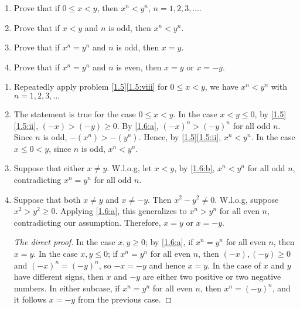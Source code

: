 \begin{pr} \label{1.6}
  \begin{enumerate}[label=(\alph*)]
    \item \label{1.6:a}
    Prove that if $0\leq x<y$, then $x^n<y^n$,
    $n=1,2,3,\dots$.
    \item \label{1.6:b}
    Prove that if $x<y$ and $n$ is odd,
    then $x^n<y^n$.
    \item \label{1.6:c}
    Prove that if $x^n=y^n$ and $n$ is odd,
    then $x=y$.
    \item \label{1.6:d}
    Prove that if $x^n=y^n$ and $n$ is even,
    then $x=y$ or $x=-y$.
  \end{enumerate}
\end{pr}
\pagebreak
\begin{solution}
  \begin{enumerate}[label=(\alph*)]
    \item
    Repeatedly apply problem \ref{1.5}\ref{1.5:viii} for
    $0\leq x<y$, we have $x^n<y^n$ with $n=1,2,3,\ldots$
    \item
    The statement is true for the case $0\leq x<y$. In
    the case $x<y\leq 0$, by \ref{1.5}\ref{1.5:ii},
    $(-x)>(-y)\geq 0$. By \ref{1.6:a}, $(-x)^n>(-y)^n$
    for all odd $n$. Since $n$ is odd, $-(x^n)>-(y^n)$.
    Hence, by \ref{1.5}\ref{1.5:ii}, $x^n<y^n$. In the
    case $x\leq 0<y$, since $n$ is odd, $x^n<y^n$.
    \item
    Suppose that either $x\neq y$. W.l.o.g, let $x<y$,
    by \ref{1.6:b}, $x^n<y^n$ for all odd $n$, contradicting
    $x^n=y^n$ for all odd $n$.
    \item
    Suppose that both $x\neq y$ and $x\neq -y$. Then
    $x^2-y^2\neq 0$. W.l.o.g, suppose $x^2>y^2\geq0$.
    Applying \ref{1.6:a}, this generalizes to
    $x^n>y^n$ for all even $n$, contradicting our assumption.
    Therefore, $x=y$ or $x=-y$.
    \renewcommand{\qedsymbol}{}
    \begin{proof}[The direct proof]
      In the case $x,y \geq 0$; by \ref{1.6:a}, if $x^n=y^n$
      for all even $n$, then $x=y$. In the case $x,y\leq 0$;
      if $x^n=y^n$ for all even $n$, then
      $(-x),(-y)\geq 0$ and $(-x)^n=(-y)^n$, so $-x=-y$
      and hence $x=y$.
      In the case of $x$ and $y$ have different signs, then
      $x$ and $-y$ are either two positive or two negative
      numbers. In either subcase, if $x^n=y^n$ for all even $n$,
      then $x^n=(-y)^n$, and it follows $x=-y$ from the
      previous case.
    \end{proof}
  \end{enumerate}
\end{solution}

